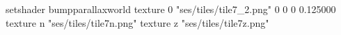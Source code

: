 setshader bumpparallaxworld
texture 0 "ses/tiles/tile7_2.png" 0 0 0 0.125000
texture n "ses/tiles/tile7n.png"
texture z "ses/tiles/tile7z.png"

